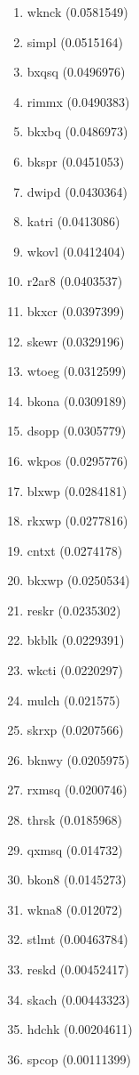 \begin{enumerate}
\item wknck (0.0581549)
\item simpl (0.0515164)
\item bxqsq (0.0496976)
\item rimmx (0.0490383)
\item bkxbq (0.0486973)
\item bkspr (0.0451053)
\item dwipd (0.0430364)
\item katri (0.0413086)
\item wkovl (0.0412404)
\item r2ar8 (0.0403537)
\item bkxcr (0.0397399)
\item skewr (0.0329196)
\item wtoeg (0.0312599)
\item bkona (0.0309189)
\item dsopp (0.0305779)
\item wkpos (0.0295776)
\item blxwp (0.0284181)
\item rkxwp (0.0277816)
\item cntxt (0.0274178)
\item bkxwp (0.0250534)
\item reskr (0.0235302)
\item bkblk (0.0229391)
\item wkcti (0.0220297)
\item mulch (0.021575)
\item skrxp (0.0207566)
\item bknwy (0.0205975)
\item rxmsq (0.0200746)
\item thrsk (0.0185968)
\item qxmsq (0.014732)
\item bkon8 (0.0145273)
\item wkna8 (0.012072)
\item stlmt (0.00463784)
\item reskd (0.00452417)
\item skach (0.00443323)
\item hdchk (0.00204611)
\item spcop (0.00111399)
\end{enumerate}